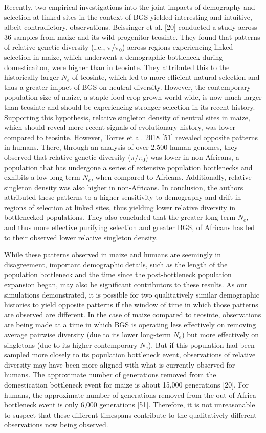 \documentclass[9pt,twocolumn,twoside]{rilabRxiv}
\begin{document}
Recently, two empirical investigations into the joint impacts of
demography and selection at linked sites in the context of BGS yielded
interesting and intuitive, albeit contradictory, observations.
Beissinger et al. [20] conducted a study across 36 samples from
maize and its wild progenitor teosinte. They found that patterns of
relative genetic diversity (i.e., $\pi/\pi_0$) across regions
experiencing linked selection in maize, which underwent a demographic
bottleneck during domesticaiton, were higher than in teosinte. They
attributed this to the historically larger $N_e$ of
teosinte, which led to more efficient natural selection and thus a
greater impact of BGS on neutral diversity. However, the contemporary
population size of maize, a staple food crop grown world-wide, is now
much larger than teosinte and should be experiencing stronger selection
in its recent history. Supporting this hypothesis, relative singleton
density of neutral sites in maize, which should reveal more recent
signals of evolutionary history, was lower compared to teosinte.
However, Torres et al. 2018 [51] revealed opposite patterns in
humans. There, through an analysis of over 2,500 human genomes, they
observed that relative genetic diversity ($\pi/\pi_0$) was
lower in non-Africans, a population that has undergone a series of
extensive population bottlenecks and exhibits a low long-term
$N_e$, when compared to Africans. Additionally,
relative singleton density was also higher in non-Africans. In
conclusion, the authors attributed these patterns to a higher
sensitivity to demography and drift in regions of selection at linked
sites, thus yielding lower relative diversity in bottlenecked
populations. They also concluded that the greater long-term
$N_e$, and thus more effective purifying selection
and greater BGS, of Africans has led to their observed lower relative
singleton density.

While these patterns observed in maize and humans are seemingly in
disagreement, important demographic details, such as the length of the
population bottleneck and the time since the post-bottleneck population
expansion began, may also be significant contributors to these results.
As our simulations demonstrated, it is possible for two qualitatively
similar demographic histories to yield opposite patterns if the window
of time in which those patterns are observed are different. In the case
of maize compared to teosinte, observations are being made at a time in
which BGS is operating less effectively on removing average pairwise
diversity (due to its lower long-term $N_e$) but
more effectively on singletons (due to its higher contemporary
$N_e$). But if this population had been sampled more
closely to its population bottleneck event, observations of relative
diversity may have been more aligned with what is currently observed for
humans. The approximate number of generations removed from the
domestication bottleneck event for maize is about 15,000 generations
[20]. For humans, the approximate number of generations removed from
the out-of-Africa bottleneck event is only 6,000 generations [51].
Therefore, it is not unreasonable to suspect that these different
timespans contribute to the qualitatively different observations now
being observed.
\end{document}
